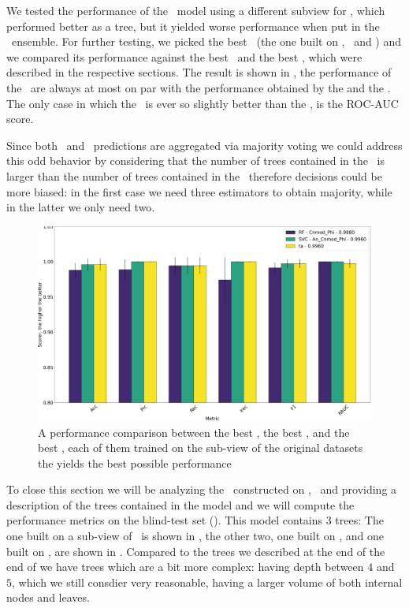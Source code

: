 We tested the performance of the \ta\ model using a different subview for \cnmod, which performed
better as a tree, but it yielded worse performance when put in the \ta\ ensemble. For further
testing, we picked the best \ta\ (the one built on \an, \bn\ and \cnmod) and we compared its
performance against the best \svc\ and the best \rf, which were described in the respective
sections. The result is shown in , the performance of the \rf\ are
always at most on par with the performance obtained by the \ta and the \svc. The only case in which
the \rf\ is ever so slightly better than the \ta, is the ROC-AUC score.

Since both \ta\ and \rf\ predictions are aggregated via majority voting we could address this odd
behavior by considering that the number of trees contained in the \rf\ is larger than the number of
trees contained in the \ta\ therefore decisions could be more biased: in the first case we need
three estimators to obtain majority, while in the latter we only need two.
\begin{figure}[!h]
	\centering
	\includegraphics[width=\linewidth]{img/best_rf_ta_svc_compared.png}
	\caption{A performance comparison between the best \rf, the best \svc, and the best \ta,
		each of them trained on the sub-view of the original datasets the yields the best possible
		performance} \label{fig:ta-rf-svc-comparison}
\end{figure}

To close this section we will be analyzing the \ta\ constructed on \an, \bn\ and \cnmod providing a
description of the trees contained in the model and we will compute the performance metrics on the
blind-test set (\db). This model contains
$3$ trees: The one built on a sub-view of \an\ is shown in , the
other two, one built on \bn, and one built on \cnmod, are shown in . Compared
to the trees we described at the end of the end of  we have trees which are a bit
more complex: having depth between $4$ and $5$, which we still consdier very reasonable, having a
larger volume of both internal nodes and leaves.


